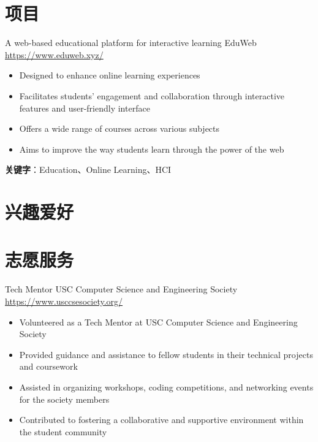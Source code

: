 \documentclass[a4paper, serif, 11pt]{moderncv}
\begin{document}
\section{项目}

        {A web-based educational platform for interactive learning}
        {EduWeb}
        {\href{https://www.eduweb.xyz/}{https://www.eduweb.xyz/}}
        {}
        {\begin{itemize}
\item Designed to enhance online learning experiences
\item Facilitates students' engagement and collaboration through interactive features and user-friendly interface
\item Offers a wide range of courses across various subjects
\item Aims to improve the way students learn through the power of the web
\end{itemize}
\textbf{关键字}：Education、Online Learning、HCI}

\section{兴趣爱好}


\section{志愿服务}

        {Tech Mentor}
        {USC Computer Science and Engineering Society}
        {\href{https://www.usccsesociety.org/}{https://www.usccsesociety.org/}}
        {}
        {\begin{itemize}
\item Volunteered as a Tech Mentor at USC Computer Science and Engineering Society
\item Provided guidance and assistance to fellow students in their technical projects and coursework
\item Assisted in organizing workshops, coding competitions, and networking events for the society members
\item Contributed to fostering a collaborative and supportive environment within the student community
\end{itemize}}
    
\end{document}
